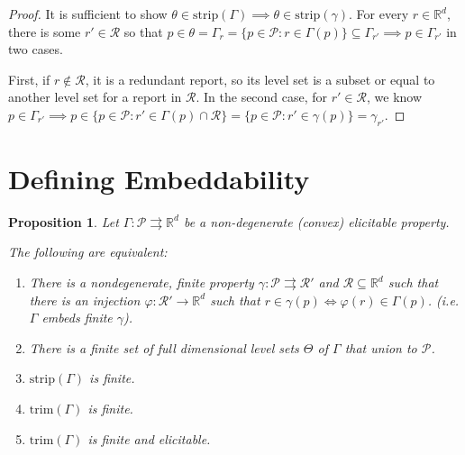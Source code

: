 \documentclass[12pt]{article}
\newcommand{\reals}{\mathbb{R}}
\renewcommand{\P}{\mathcal{P}}
\newcommand{\R}{\mathcal{R}}
\newcommand{\toto}{\rightrightarrows}
\newcommand{\trim}{\mathrm{trim}}
\newcommand{\strip}{\mathrm{strip}}
\newtheorem{proposition}{Proposition}
\begin{document}
\begin{proof}
	It is sufficient to show $\theta \in \strip(\Gamma) \implies \theta \in \strip(\gamma)$.
	For every $r \in \reals^d$, there is some $r' \in \R$ so that $ p \in \theta = \Gamma_r = \{ p \in \P : r \in \Gamma(p) \} \subseteq \Gamma_{r'} \implies p \in \Gamma_{r'}$ in two cases.
	
	First, if $r \not \in \R$, it is a redundant report, so its level set is a subset or equal to another level set for a report in $\R$.
	In the second case, for $r' \in \R$, we know $p \in \Gamma_{r'} \implies p \in \{ p \in \P : r' \in \Gamma(p) \cap \R \} = \{ p \in \P : r' \in \gamma(p) \} = \gamma_{r'}$. 
\end{proof}




\section{Defining Embeddability}


\begin{proposition}\label{prop:optimal-reports-per-level-set}
  Let $\Gamma:\P\toto\reals^d$ be a non-degenerate (convex) elicitable property.

  The following are equivalent:
  \begin{enumerate}
  \item There is a nondegenerate, finite property $\gamma:\P\toto\R'$ and $\R \subseteq \reals^d$ such that there is an injection $\varphi:\R'\to\reals^d$ such that $r\in\gamma(p) \iff \varphi(r) \in \Gamma(p)$. (i.e. $\Gamma$ embeds finite $\gamma$).  
  \item There is a finite set of full dimensional level sets $\Theta$ of $\Gamma$ that union to $\P$.
  \item $\strip(\Gamma)$ is finite.
  \item $\trim(\Gamma)$ is finite.
  \item $\trim(\Gamma)$ is finite and elicitable.

  
  \end{enumerate}
\end{proposition}
\end{document}
